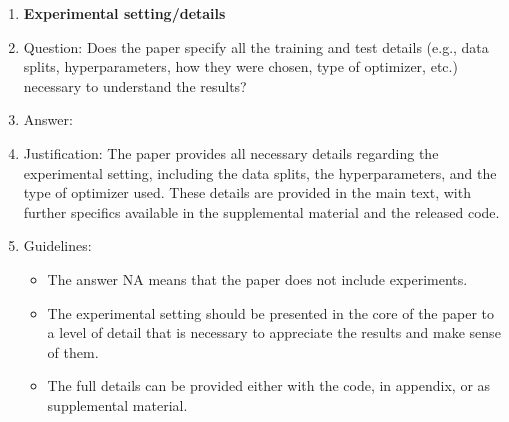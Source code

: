 \documentclass{article}
\begin{document}
\begin{enumerate}
\item {\bf Experimental setting/details}
    \item[] Question: Does the paper specify all the training and test details (e.g., data splits, hyperparameters, how they were chosen, type of optimizer, etc.) necessary to understand the results?
    \item[] Answer: \answerYes{} %
    \item[] Justification: The paper provides all necessary details regarding the experimental setting, including the data splits, the hyperparameters, and the type of optimizer used. These details are provided in the main text, with further specifics available in the supplemental material and the released code.
    \item[] Guidelines:
    \begin{itemize}
        \item The answer NA means that the paper does not include experiments.
        \item The experimental setting should be presented in the core of the paper to a level of detail that is necessary to appreciate the results and make sense of them.
        \item The full details can be provided either with the code, in appendix, or as supplemental material.
    \end{itemize}


\end{enumerate}
\end{document}
